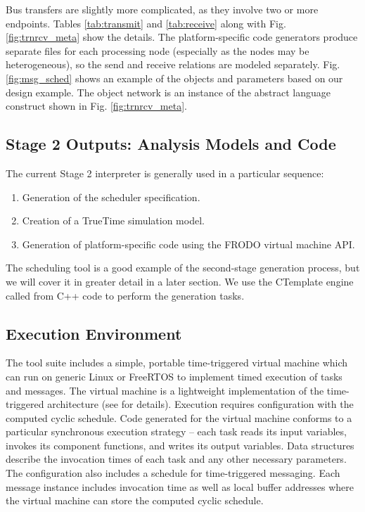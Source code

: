 Bus transfers are slightly more complicated, as they involve two or more
endpoints.  Tables \ref{tab:transmit} and \ref{tab:receive} along with Fig.
\ref{fig:trnrcv_meta} show the details. The platform-specific code generators
produce separate files for each processing node (especially as the nodes
may be heterogeneous), so the send and receive relations are modeled separately. Fig. 
\ref{fig:msg_sched} shows an example of the objects and parameters based on our
design example.  The object network is an instance of the abstract language construct
shown in Fig. \ref{fig:trnrcv_meta}.

\subsection{Stage 2 Outputs: Analysis Models and Code}

The current Stage 2 interpreter is generally used in a particular sequence:

\begin{enumerate}
 \item Generation of the scheduler specification.
 \item Creation of a TrueTime simulation model.
 \item Generation of platform-specific code using the FRODO virtual machine API.
\end{enumerate}

The scheduling tool is a good example of the second-stage generation
process, but we will cover it in greater detail in a later section.  
We use the CTemplate engine\cite{tools:ctemplate} called from C++ code to perform the generation tasks.

\subsection{Execution Environment}
\label{sect:frodogen}

The tool suite includes a simple, portable time-triggered virtual machine\cite{timed:frodo} 
which can run on generic Linux or FreeRTOS to implement timed execution of tasks and messages.  
The virtual machine is a lightweight implementation of the time-triggered 
architecture\cite{timed:tta} (see \cite{timed:frodo} for details).  Execution requires 
configuration with the computed cyclic schedule.  Code generated for the virtual machine 
conforms to a particular synchronous execution strategy -- each task reads its input variables, 
invokes its component functions, and writes its output variables.  Data structures describe the 
invocation times of each task and any other necessary parameters.  The configuration also includes 
a schedule for time-triggered messaging.  Each message instance includes invocation time as well as 
local buffer addresses where the virtual machine can store the computed cyclic schedule.  

